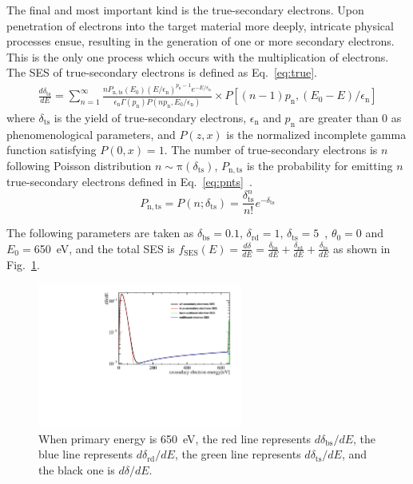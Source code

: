 The final and most important kind is the true-secondary electrons.
Upon penetration of electrons into the target material more deeply, intricate physical processes ensue,
resulting in the generation of one or more secondary electrons.
This is the only one process which occurs with the multiplication of electrons.
The SES of true-secondary electrons is defined as Eq.~\eqref{eq:true}.
\begin{equation}
    \label{eq:true}
    \begin{aligned}
        \frac{d \delta_{\mathrm{ts}}}{d E}=  \sum_{n=1}^{\infty}
        \frac{n P_{\mathrm{n, ts}}\left(E_0\right)
        \left(E / \epsilon_{\mathrm{n}}\right)^{p_{\mathrm{n}}-1} e^{-E / \epsilon_{\mathrm{n}}}}
        {\epsilon_{\mathrm{n}} \Gamma\left(p_{\mathrm{n}}\right) P\left(n p_{\mathrm{n}}, E_0 / \epsilon_{\mathrm{n}}\right)}
        \times P\left[(n-1) p_{\mathrm{n}},\left(E_0-E\right) / \epsilon_{\mathrm{n}}\right]
    \end{aligned}
\end{equation}
where $\delta_{\mathrm{ts}}$
is the yield of true-secondary electrons,
$\epsilon_{\mathrm{n}}$ and $p_{\mathrm{n}}$ are greater than 0 as phenomenological parameters,
and $P(z,x)$ is the normalized incomplete gamma function satisfying $P(0,x)=1$.
The number of true-secondary electrons is $n$ following Poisson distribution $n\sim \mathrm{\pi}(\delta_{\mathrm{ts}})$,
$P_{\mathrm{n, ts}}$ is the probability for emitting $n$ true-secondary electrons
defined in Eq.~\eqref{eq:pnts}~\cite{2002Probabilistic}.
\begin{equation}
    \label{eq:pnts}
    P_{\mathrm{n, ts}}=P(n;\delta_{\mathrm{ts}}) = \frac{\delta_{\mathrm{ts}}^{n}}{n!}e^{-\delta_{\mathrm{ts}}}
\end{equation}

The following parameters are taken as
$\delta_{\mathrm{bs}}=0.1$, $\delta_{\mathrm{rd}}=1$, $\delta_{\mathrm{ts}}=5$~\cite{2021Effects},
$\theta_0=0$ and $E_0=$\SI{650}{eV},
and the total SES is
$f_\mathrm{SES}(E) = \frac{d\delta}{dE}=\frac{\delta_{\mathrm{bs}}}{dE}+\frac{\delta_{\mathrm{rd}}}{dE}+\frac{\delta_{\mathrm{ts}}}{dE}$
as shown in Fig.~\ref{fig:SES}.

\begin{figure}[ht]
    \centering
    \includegraphics[width=0.6\textwidth]{pic/SES.pdf}
    \caption{When primary energy is \SI{650}{eV},
        the red line represents $d\delta_{\mathrm{bs}}/dE$,
        the blue line represents $d\delta_{\mathrm{rd}}/dE$,
        the green line represents $d\delta_{\mathrm{ts}}/dE$,
        and the black one is $d\delta/dE$.}
    \label{fig:SES}
\end{figure}


